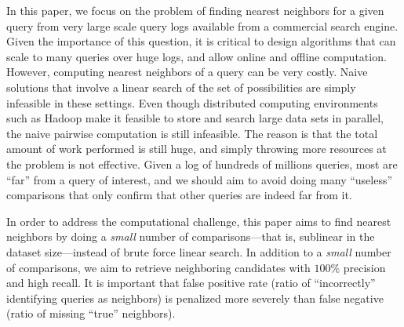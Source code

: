 In this paper, we focus on the problem of finding nearest neighbors
for a given query from very large scale query logs available from a commercial search engine. 
Given the importance of this question, it is critical to design
algorithms that can scale to many queries over huge logs, and allow
online and offline computation. 
However, computing nearest neighbors of a query 
can be very costly. 
Naive solutions that involve a linear search of the set of possibilities
are simply infeasible in these settings. 
Even though distributed computing environments such as Hadoop
make it feasible to store and search large data sets in parallel, 
the naive pairwise computation is still infeasible. 
The reason is that the total amount of work performed is still huge,
and simply throwing more resources at the problem is not effective. 
Given a log of hundreds of millions queries, most are ``far'' from a
query of interest, and we should aim to avoid doing many ``useless''
comparisons that only confirm that other queries are indeed far from it. 

In order to address the computational challenge, this paper aims to find nearest neighbors by doing a 
\emph{small} number of comparisons---that is, sublinear in the dataset size---instead of brute force linear search. 
In addition to a \emph{small} number of comparisons, we aim to 
retrieve neighboring candidates with $100\%$ precision and high recall.
It is important that false positive rate (ratio of  ``incorrectly'' identifying queries as neighbors) 
is penalized more severely than false negative (ratio of missing ``true'' neighbors).

